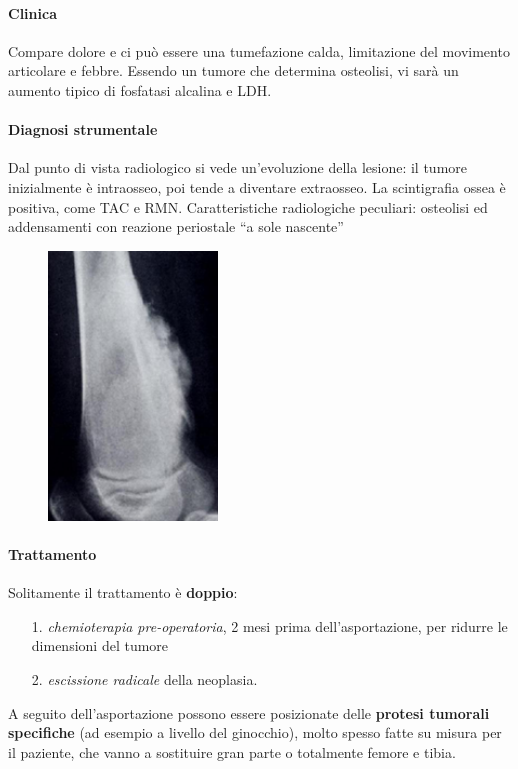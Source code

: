 \paragraph{Clinica}
Compare dolore e ci può essere una tumefazione calda, limitazione del movimento articolare e febbre. Essendo un tumore che determina osteolisi, vi sarà un aumento tipico di fosfatasi alcalina e LDH.

\paragraph{Diagnosi strumentale}
Dal punto di vista radiologico si vede un'evoluzione della lesione: il tumore inizialmente è intraosseo, poi tende a diventare extraosseo.
La scintigrafia ossea è positiva, come TAC e RMN.
Caratteristiche radiologiche peculiari: osteolisi ed addensamenti con reazione periostale ``a sole nascente''

\begin{figure}[!ht]
\centering
\includegraphics[width=0.4\textwidth]{010/image2.png}
\end{figure}

\paragraph{Trattamento}
Solitamente il trattamento è \textbf{doppio}:
\begin{itemize}
\item[1.]
  \emph{chemioterapia pre-operatoria}, 2 mesi prima dell'asportazione, per ridurre le dimensioni del tumore
\item[2.]
  \emph{escissione radicale} della neoplasia.
\end{itemize}
A seguito dell'asportazione possono essere posizionate delle \textbf{protesi tumorali specifiche} (ad esempio a livello del ginocchio), molto spesso fatte su misura per il paziente, che vanno a sostituire gran parte o totalmente femore e tibia.

